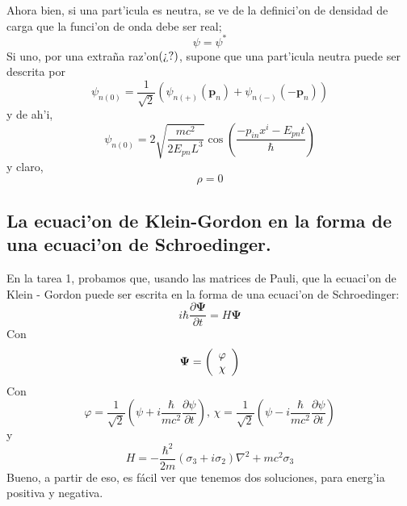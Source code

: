 Ahora bien, si una part'icula es neutra, se ve de la definici'on de
densidad de carga que la funci'on de onda debe ser real;
\begin{equation}
\psi=\psi^{\ast}%
\end{equation}
Si uno, por una extra\~{n}a raz'on$\left(  \text{\textquestiondown ?}%
\right)  $, supone que una part'icula neutra puede ser descrita por
\begin{equation}
\psi_{n\left(  0\right)  }=\frac{1}{\sqrt{2}}\left(  \psi_{n\left(  +\right)
}\left(  \mathbf{p}_{n}\right)  +\psi_{n\left(  -\right)  }\left(
-\mathbf{p}_{n}\right)  \right)
\end{equation}
y de ah'i,
\begin{equation}
\psi_{n\left(  0\right)  }=2\sqrt{\frac{mc^{2}}{2E_{pn}L^{3}}}\cos\left(
\frac{-p_{in}x^{i}-E_{pn}t}{\hbar}\right)
\end{equation}
y claro,
\begin{equation}
\rho=0
\end{equation}


\subsection{La ecuaci'on de Klein-Gordon en la forma de una ecuaci'on de
Schroedinger.}

En la tarea 1, probamos que, usando las matrices de Pauli, que la ecuaci'on
de Klein - Gordon puede ser escrita en la forma de una ecuaci'on de
Schroedinger:
\begin{equation}
i\hbar\frac{\partial\mathbf{\Psi}}{\partial t}=H\mathbf{\Psi}%
\end{equation}
Con
\begin{equation}
\mathbf{\Psi}=\left(
\begin{array}
[c]{c}%
\varphi\\
\chi
\end{array}
\right)
\end{equation}
Con
\begin{equation}
\varphi=\frac{1}{\sqrt{2}}\left(  \psi+i\frac{\hbar}{mc^{2}}\frac{\partial
\psi}{\partial t}\right)  \text{, }\chi=\frac{1}{\sqrt{2}}\left(  \psi
-i\frac{\hbar}{mc^{2}}\frac{\partial\psi}{\partial t}\right)
\end{equation}
y
\begin{equation}
H=-\frac{\hbar^{2}}{2m}\left(  \sigma_{3}+i\sigma_{2}\right)  \nabla
^{2}+mc^{2}\sigma_{3}%
\end{equation}
Bueno, a partir de eso, es f\'{a}cil ver que tenemos dos soluciones, para
energ'ia positiva y negativa.


